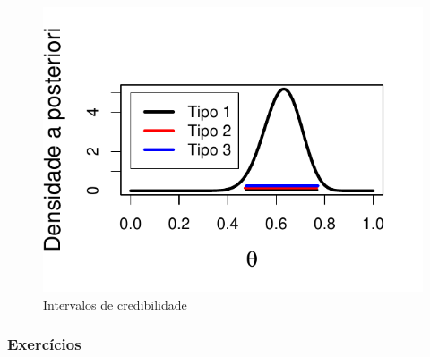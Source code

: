 \begin{example}
\begin{knitrout}
\begin{kframe}
\begin{alltt}
\hlstd{(}\hlstd{,}\hlstd{),}\hlstd{=}\hlstd{)}
\hlstd{(}\hlstd{,}\hlstd{),}\hlstd{=}\hlstd{,}\hlstd{=}\hlstd{)}
\hlstd{(}\hlstd{,}\hlstd{),}\hlstd{=}\hlstd{,}\hlstd{=}\hlstd{)}
\hlstd{(}\hlstd{,}\hlstd{,}\hlstd{=}\hlstd{(}\hlstd{,}\hlstd{,}\hlstd{),} \hlstd{=} \hlstd{(}\hlstd{,}\hlstd{,}\hlstd{),}\hlstd{=}\hlstd{)}
\end{alltt}
\end{kframe}\begin{figure}[t]

{\centering \includegraphics[width=\maxwidth]{./figures/intervalos-1} 

}

\caption[Intervalos de credibilidade]{Intervalos de credibilidade}\label{fig:intervalos}
\end{figure}


\end{knitrout}


\end{example}

\subsubsection*{Exercícios}


